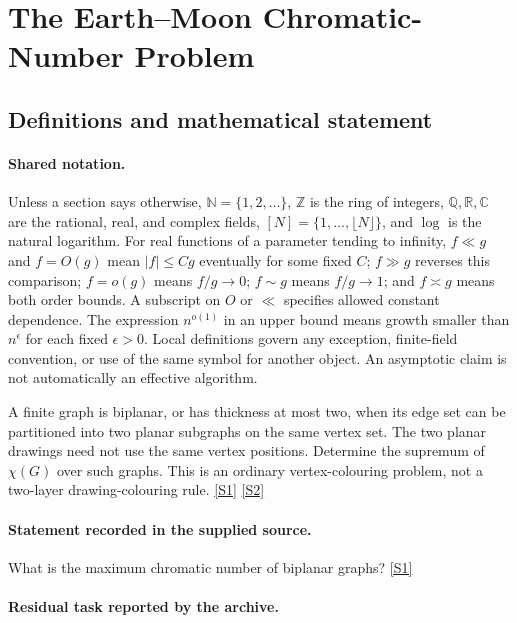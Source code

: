 \documentclass[11pt,a4paper]{article}
\newcommand{\N}{\mathbb{N}}
\newcommand{\Z}{\mathbb{Z}}
\newcommand{\Q}{\mathbb{Q}}
\newcommand{\R}{\mathbb{R}}
\newcommand{\C}{\mathbb{C}}
\newcommand{\sref}[2]{\hyperlink{source:#1:#2}{[S#2]}}
\begin{document}
\section{The Earth--Moon Chromatic-Number Problem}\label{statement}


\subsection{Definitions and mathematical statement}

\paragraph{Shared notation.}Unless a section says otherwise, $\N=\{1,2,\ldots\}$,
$\Z$ is the ring of integers, $\Q,\R,\C$ are the rational, real, and complex
fields, $[N]=\{1,\ldots,\lfloor N\rfloor\}$, and $\log$ is the natural
logarithm. For real functions of a parameter tending to infinity,
$f\ll g$ and $f=O(g)$ mean $|f|\leq Cg$ eventually for some fixed $C$;
$f\gg g$ reverses this comparison; $f=o(g)$ means $f/g\to0$;
$f\sim g$ means $f/g\to1$; and $f\asymp g$ means both order bounds.
A subscript on $O$ or $\ll$ specifies allowed constant dependence.
The expression $n^{o(1)}$ in an upper bound means growth smaller than
$n^\epsilon$ for each fixed $\epsilon>0$. Local definitions govern any
exception, finite-field convention, or use of the same symbol for another
object. An asymptotic claim is not automatically an effective algorithm.



A finite graph is biplanar, or has thickness at most two, when its edge set can be partitioned into two planar subgraphs on the same vertex set. The two planar drawings need not use the same vertex positions. Determine the supremum of $\chi(G)$ over such graphs. This is an ordinary vertex-colouring problem, not a two-layer drawing-colouring rule. \sref{statement}{1} \sref{statement}{2}

\paragraph{Statement recorded in the supplied source.}
What is the maximum chromatic number of biplanar graphs? \sref{statement}{1}

\paragraph{Residual task reported by the archive.}
\end{document}
